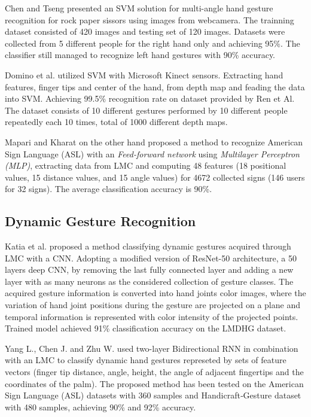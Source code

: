 Chen and Tseng \cite{chentseng} presented an SVM solution for multi-angle hand gesture recognition for rock paper sissors using images from webcamera. The trainning dataset consisted of 420 images and testing set of 120 images. 
Datasets were collected from 5 different people for the right hand only and achieving 95\%. The classifier still managed to recognize left hand gestures with 90\% accuracy. 

Domino et al. \cite{dominokinect} utilized SVM with Microsoft Kinect sensors. Extracting hand features, finger tips and center of the hand, from depth map and feading the data into SVM. Achieving 99.5\% recognition rate on dataset provided by Ren et Al. \cite{dominokinect_data} The dataset consists of 10 different gestures performed by 10 different people repeatedly each 10 times, total of 1000 different depth maps.

Mapari and Kharat\cite{mapari} on the other hand proposed a method to recognize American Sign Language (ASL) with an \textit{Feed-forward network} using \textit{Multilayer Perceptron (MLP)}, extracting data from LMC and computing 48 features (18 positional values, 15 distance values, and 15 angle values) for 4672 collected signs (146 users for 32 signs). The average classification accuracy is 90\%.

\subsection{Dynamic Gesture Recognition}

Katia et al. \cite{katiacnn} proposed a method classifying dynamic gestures acquired through LMC with a CNN.
Adopting a modified version of ResNet-50 architecture, a 50 layers deep CNN, by removing the last fully connected layer and adding a new layer with as many neurons as the considered collection of gesture classes. 
The acquired gesture information is converted into hand joints color images, where the variation of hand joint positions during the gesture are projected on a plane and temporal information is represented with color intensity of the projected points. Trained model achieved 91\% classification accuracy on the LMDHG dataset.\cite{lmdhg}

Yang L., Chen J. and Zhu W. \cite{bidirect_dynam} used two-layer Bidirectional RNN in combination with an LMC to classify dynamic hand gestures represeted by sets of feature vectors (finger tip distance, angle, height, the angle of adjacent fingertips and the coordinates of the palm). The proposed method has been tested on the American Sign Language (ASL) datasets with 360 samples and Handicraft‐Gesture dataset with 480 samples, achieving 90\% and 92\% accuracy.\cite{bidirect_dynam}

